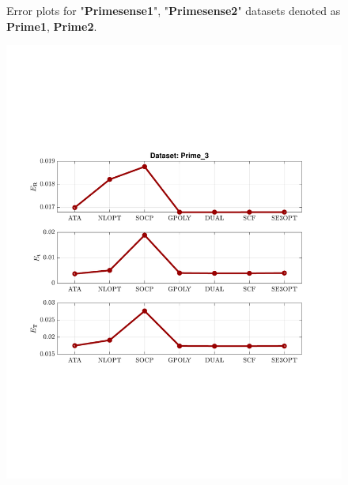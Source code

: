 \begin{figure}
\caption{Error plots for "\textbf{Primesense{\textunderscore}1}", "\textbf{Primesense{\textunderscore}2}" datasets denoted as \textbf{Prime{\textunderscore}1}, \textbf{Prime{\textunderscore}2}.}
\end{figure}

\begin{figure}
\centering
\includegraphics[scale=0.7]{./hand_eye_figures/real/adv_Result_Prime_3}

\end{figure}

